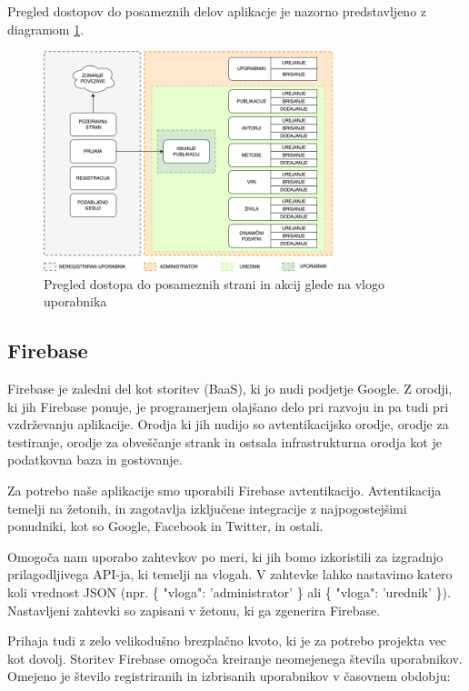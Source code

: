 \documentclass[a4paper, 12pt]{book}
\begin{document}
Pregled dostopov do posameznih delov aplikacje je nazorno predstavljeno z diagramom \ref{user-rights}.
\begin{figure}[h]
\begin{center}
\includegraphics[width=0.75\textwidth]{slike/user_hierarchy.png}
\end{center}
\caption{ Pregled dostopa do posameznih strani in akcij glede na vlogo uporabnika }
\label{user-rights}
\end{figure}


\subsection{Firebase}
Firebase je zaledni del kot storitev (BaaS), ki jo nudi podjetje Google. Z orodji, ki jih Firebase ponuje, je programerjem olajšano delo pri razvoju in pa tudi pri vzdrževanju aplikacije. Orodja ki jih nudijo so avtentikacijsko orodje, orodje za testiranje, orodje za obveščanje strank in ostsala infrastrukturna orodja kot je podatkovna baza in  gostovanje. \cite{firebase-about}

Za potrebo naše aplikacije smo uporabili Firebase avtentikacijo. Avtentikacija temelji na žetonih, in zagotavlja izključene integracije z najpogostejšimi ponudniki, kot so Google, Facebook in Twitter, in ostali.

Omogoča nam uporabo zahtevkov po meri, ki jih bomo izkoristili za izgradnjo prilagodljivega API-ja, ki temelji na vlogah. V zahtevke lahko nastavimo katero koli vrednost JSON (npr. \{ "vloga": 'administrator' \} ali \{ "vloga": 'urednik' \}). Nastavljeni zahtevki so zapisani v žetonu, ki ga zgenerira Firebase.

Prihaja tudi z zelo velikodušno brezplačno kvoto, ki je za potrebo projekta vec kot dovolj. Storitev Firebase omogoča kreiranje neomejenega števila uporabnikov. Omejeno je število registriranih in izbrisanih uporabnikov v časovnem obdobju:
\end{document}
